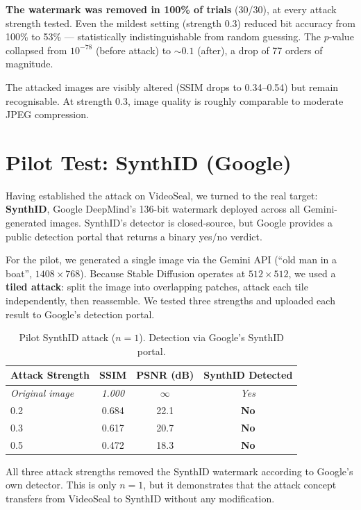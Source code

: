 \documentclass[11pt,a4paper]{article}
\begin{document}
\textbf{The watermark was removed in 100\% of trials} (30/30), at every
attack strength tested. Even the mildest setting (strength 0.3) reduced
bit accuracy from 100\% to 53\% --- statistically indistinguishable from
random guessing. The $p$-value collapsed from $10^{-78}$ (before attack)
to $\sim\!0.1$ (after), a drop of 77 orders of magnitude.

The attacked images are visibly altered (SSIM drops to 0.34--0.54) but
remain recognisable. At strength 0.3, image quality is roughly
comparable to moderate JPEG compression.

\section{Pilot Test: SynthID (Google)}

Having established the attack on VideoSeal, we turned to the real
target: \textbf{SynthID}, Google DeepMind's 136-bit watermark deployed
across all Gemini-generated images. SynthID's detector is closed-source,
but Google provides a public detection portal that returns a binary
yes/no verdict.

For the pilot, we generated a single image via the Gemini API (``old man
in a boat'', $1408 \times 768$). Because Stable Diffusion operates at
$512 \times 512$, we used a \textbf{tiled attack}: split the image into
overlapping patches, attack each tile independently, then reassemble.
We tested three strengths and uploaded each result to Google's detection
portal.

\begin{table}[h]
\centering
\caption{Pilot SynthID attack ($n = 1$). Detection via Google's
SynthID portal.}
\label{tab:synthid-pilot}
\begin{tabular}{lccc}
\toprule
\textbf{Attack Strength} & \textbf{SSIM} & \textbf{PSNR (dB)} &
\textbf{SynthID Detected} \\
\midrule
\textit{Original image} & \textit{1.000} & $\infty$ & \textit{Yes} \\
\midrule
0.2 & 0.684 & 22.1 & \textbf{No} \\
0.3 & 0.617 & 20.7 & \textbf{No} \\
0.5 & 0.472 & 18.3 & \textbf{No} \\
\bottomrule
\end{tabular}
\end{table}

All three attack strengths removed the SynthID watermark according to
Google's own detector. This is only $n = 1$, but it demonstrates that
the attack concept transfers from VideoSeal to SynthID without any
modification.
\end{document}
